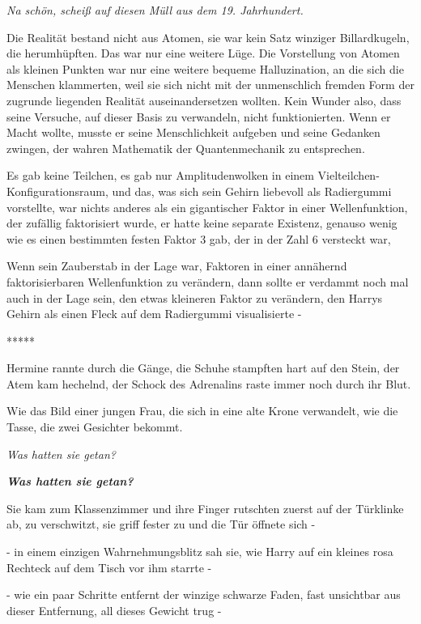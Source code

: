 \emph{Na schön, scheiß auf diesen Müll aus dem 19. Jahrhundert.}

Die Realität bestand nicht aus Atomen, sie war kein Satz winziger Billardkugeln,
die herumhüpften. Das war nur eine weitere Lüge. Die Vorstellung von Atomen als
kleinen Punkten war nur eine weitere bequeme Halluzination, an die sich die
Menschen klammerten, weil sie sich nicht mit der unmenschlich fremden Form der
zugrunde liegenden Realität auseinandersetzen wollten. Kein Wunder also, dass
seine Versuche, auf dieser Basis zu verwandeln, nicht funktionierten. Wenn er
Macht wollte, musste er seine Menschlichkeit aufgeben und seine Gedanken
zwingen, der wahren Mathematik der Quantenmechanik zu entsprechen.

Es gab keine Teilchen, es gab nur Amplitudenwolken in einem
Vielteilchen-Konfigurationsraum, und das, was sich sein Gehirn liebevoll als
Radiergummi vorstellte, war nichts anderes als ein gigantischer Faktor in einer
Wellenfunktion, der zufällig faktorisiert wurde, er hatte keine separate
Existenz, genauso wenig wie es einen bestimmten festen Faktor 3 gab, der in der
Zahl 6 versteckt war,

Wenn sein Zauberstab in der Lage war, Faktoren in einer annähernd
faktorisierbaren Wellenfunktion zu verändern, dann sollte er verdammt noch mal
auch in der Lage sein, den etwas kleineren Faktor zu verändern, den Harrys
Gehirn als einen Fleck auf dem Radiergummi visualisierte -

\begin{center}*****\end{center}

Hermine rannte durch die Gänge, die Schuhe stampften hart auf den Stein, der
Atem kam hechelnd, der Schock des Adrenalins raste immer noch durch ihr Blut.

Wie das Bild einer jungen Frau, die sich in eine alte Krone verwandelt, wie die
Tasse, die zwei Gesichter bekommt.

\emph{Was hatten sie getan?}

\textbf{\emph{Was hatten sie getan?}}

Sie kam zum Klassenzimmer und ihre Finger rutschten zuerst auf der Türklinke ab,
zu verschwitzt, sie griff fester zu und die Tür öffnete sich -

- in einem einzigen Wahrnehmungsblitz sah sie, wie Harry auf ein kleines rosa
Rechteck auf dem Tisch vor ihm starrte -

- wie ein paar Schritte entfernt der winzige schwarze Faden, fast unsichtbar aus
dieser Entfernung, all dieses Gewicht trug -

